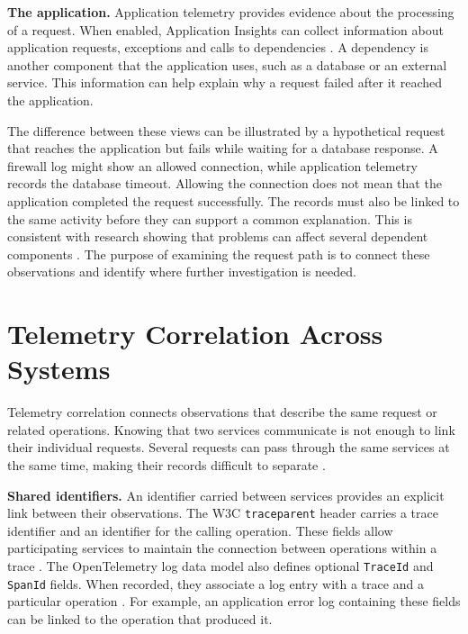 \noindent\textbf{The application.} Application telemetry provides evidence
about the processing of a request. When enabled, Application Insights can
collect information about application requests, exceptions and calls to
dependencies \parencite{microsoft2026monitordata}. A dependency is another
component that the application uses, such as a database or an external
service. This information can help explain why a request failed after it
reached the application.

The difference between these views can be illustrated by a hypothetical
request that reaches the application but fails while waiting for a database
response. A firewall log might show an allowed connection, while application
telemetry records the database timeout. Allowing the connection does not
mean that the application completed the request successfully. The records
must also be linked to the same activity before they can support a common
explanation. This is consistent with research showing that problems can
affect several dependent components
\parencite{gan2021sage}. The purpose of examining the request path is to
connect these observations and identify where further investigation is
needed.


\section{Telemetry Correlation Across Systems}
\label{sec:background:correlation}

Telemetry correlation connects observations that describe the same request
or related operations. Knowing that two services communicate is not enough
to link their individual requests. Several requests can pass through the
same services at the same time, making their records difficult to separate
\parencite{ashok2024traceweaver}.

\noindent\textbf{Shared identifiers.} An identifier carried between services
provides an explicit link between their observations. The W3C
\texttt{traceparent} header carries a trace identifier and an identifier
for the calling operation. These fields allow participating services to
maintain the connection between operations within a trace
\parencite{w3c2021tracecontext}. The OpenTelemetry log data model also
defines optional \texttt{TraceId} and \texttt{SpanId} fields. When recorded,
they associate a log entry with a trace and a particular operation
\parencite{opentelemetry2026logsmodel}. For example, an application error
log containing these fields can be linked to the operation that produced it.

